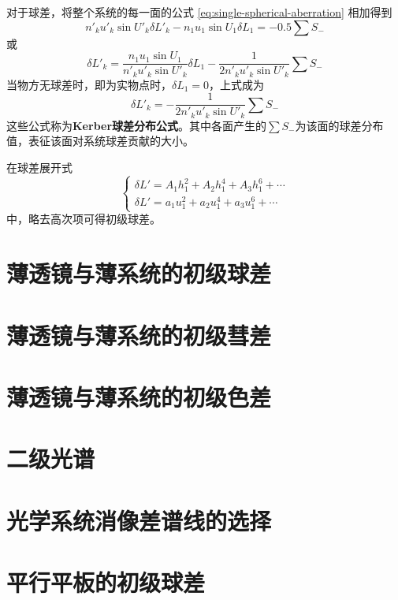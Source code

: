 \documentclass[cn,10pt,chinesefont=founder,math=mtpro2,cite=super,toc=onecol,twoside,openany]{elegantbook}
\begin{document}
对于球差，将整个系统的每一面的公式 \eqref{eq:single-spherical-aberration} 相加得到
\begin{equation}
n'_ku'_k\sin U'_k\delta L'_k-n_1u_1\sin U_1\delta L_1=-0.5\sum S_{-}
\end{equation}
或
\begin{equation}
\delta L'_k=\frac{n_1u_1\sin U_1}{n'_ku'_k\sin U'_k}\delta L_1-\frac{1}{2n'_ku'_k\sin U'_k}\sum S_{-}
\end{equation}
当物方无球差时，即为实物点时，$\delta L_1=0$，上式成为
\begin{equation}
\delta L'_k=-\frac{1}{2n'_ku'_k\sin U'_k}\sum S_{-}
\end{equation}
这些公式称为\textbf{Kerber球差分布公式}。其中各面产生的$\sum S_{-}$为该面的球差分布值，表征该面对系统球差贡献的大小。

在球差展开式
\begin{equation}
\begin{cases}
\delta L'=A_1h^2_1+A_2h^4_1+A_3h^6_1+\cdots\\
\delta L'=a_1u^2_1+a_2u^4_1+a_3u^6_1+\cdots
\end{cases}
\end{equation}
中，略去高次项可得初级球差。

\section{薄透镜与薄系统的初级球差}

\section{薄透镜与薄系统的初级彗差}

\section{薄透镜与薄系统的初级色差}

\section{二级光谱}

\section{光学系统消像差谱线的选择}

\section{平行平板的初级球差}
\end{document}
